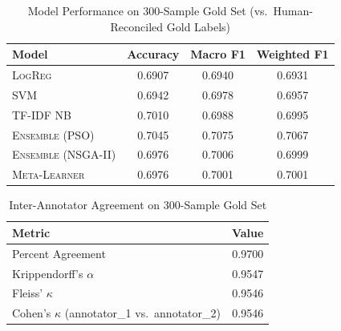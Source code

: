 \begin{table}[ht]
\centering
\caption{Model Performance on 300-Sample Gold Set (vs.\ Human-Reconciled Gold Labels)}
\label{tab:gold_set_performance}
\begin{tabular}{lccc}
\hline
Model & Accuracy & Macro F1 & Weighted F1 \\
\hline
\textsc{LogReg} & 0.6907 & 0.6940 & 0.6931 \\
\textsc{SVM} & 0.6942 & 0.6978 & 0.6957 \\
\textsc{TF-IDF NB} & 0.7010 & 0.6988 & 0.6995 \\
\textsc{Ensemble (PSO)} & 0.7045 & 0.7075 & 0.7067 \\
\textsc{Ensemble (NSGA-II)} & 0.6976 & 0.7006 & 0.6999 \\
\textsc{Meta-Learner} & 0.6976 & 0.7001 & 0.7001 \\
\hline
\end{tabular}
\end{table}

\begin{table}[ht]
\centering
\caption{Inter-Annotator Agreement on 300-Sample Gold Set}
\label{tab:gold_set_iaa}
\begin{tabular}{lc}
\hline
Metric & Value \\
\hline
Percent Agreement & 0.9700 \\
Krippendorff's $\alpha$ & 0.9547 \\
Fleiss' $\kappa$ & 0.9546 \\
Cohen's $\kappa$ (annotator\_1 vs.\ annotator\_2) & 0.9546 \\
\hline
\end{tabular}
\end{table}